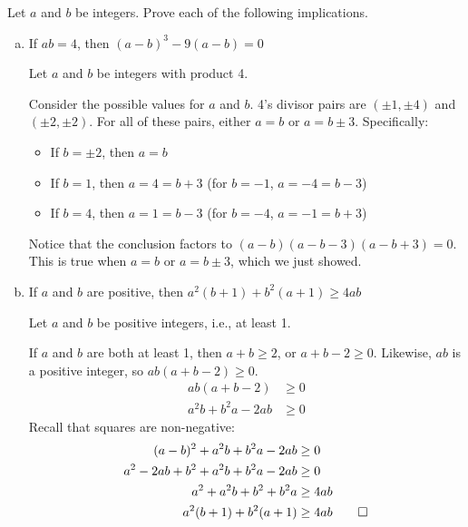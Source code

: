 \begin{recommended}
  Let $a$ and $b$ be integers. Prove each of the following implications.
\end{recommended}
\begin{enumerate}[(a)]
  \item If $ab = 4$, then $(a-b)^3 - 9(a-b) = 0$
        \begin{prf}
          Let $a$ and $b$ be integers with product 4.

          Consider the possible values for $a$ and $b$.
          4's divisor pairs are $(\pm 1, \pm 4)$ and $(\pm 2, \pm 2)$.
          For all of these pairs, either $a=b$ or $a=b\pm3$.
          Specifically:
          \begin{itemize}
            \item If $b=\pm2$, then $a=b$
            \item If $b=1$, then $a=4=b+3$ (for $b=-1$, $a=-4=b-3$)
            \item If $b=4$, then $a=1=b-3$ (for $b=-4$, $a=-1=b+3$)
          \end{itemize}

          Notice that the conclusion factors to $(a-b)(a-b-3)(a-b+3)=0$.
          This is true when $a=b$ or $a=b\pm3$, which we just showed.
        \end{prf}
  \item If $a$ and $b$ are positive, then $a^2(b+1) + b^2(a+1) \geq 4ab$
        \begin{prf}
          Let $a$ and $b$ be positive integers, i.e., at least 1.

          If $a$ and $b$ are both at least 1, then $a+b \geq 2$, or $a+b-2 \geq 0$.
          Likewise, $ab$ is a positive integer, so $ab(a+b-2) \geq 0$.
          \begin{align*}
            ab(a+b-2)         & \geq 0 \\
            a^2b + b^2a - 2ab & \geq 0
          \end{align*}
          Recall that squares are non-negative:
          \begin{align*}
            (a-b)^2 + a^2b + b^2a - 2ab         & \geq 0            \\
            a^2 - 2ab + b^2 + a^2b + b^2a - 2ab & \geq 0            \\
            a^2 + a^2b + b^2 + b^2a             & \geq 4ab          \\
            a^2(b+1) + b^2(a+1)                 & \geq 4ab \qedhere
          \end{align*}
        \end{prf}
\end{enumerate}


